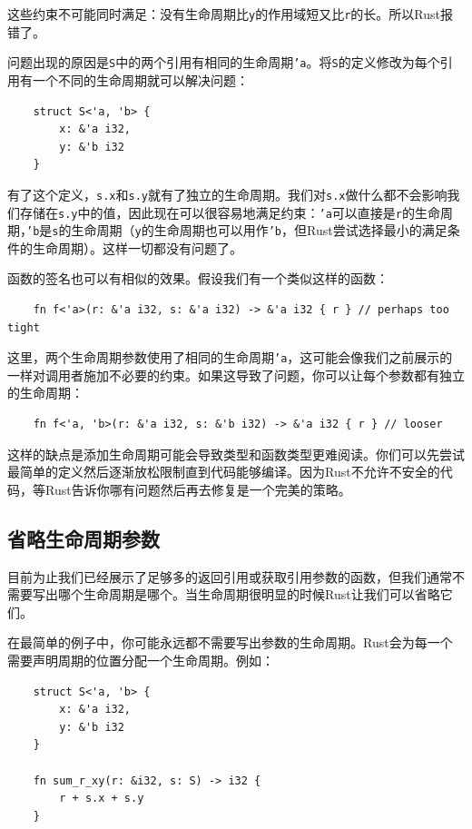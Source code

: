 这些约束不可能同时满足：没有生命周期比\texttt{y}的作用域短又比\texttt{r}的长。所以Rust报错了。

问题出现的原因是\texttt{S}中的两个引用有相同的生命周期\texttt{'a}。将\texttt{S}的定义修改为每个引用有一个不同的生命周期就可以解决问题：
\begin{verbatim}
    struct S<'a, 'b> {
        x: &'a i32,
        y: &'b i32
    }
\end{verbatim}

有了这个定义，\texttt{s.x}和\texttt{s.y}就有了独立的生命周期。我们对\texttt{s.x}做什么都不会影响我们存储在\texttt{s.y}中的值，因此现在可以很容易地满足约束：\texttt{'a}可以直接是\texttt{r}的生命周期，\texttt{'b}是\texttt{s}的生命周期（\texttt{y}的生命周期也可以用作\texttt{'b}，但Rust尝试选择最小的满足条件的生命周期）。这样一切都没有问题了。

函数的签名也可以有相似的效果。假设我们有一个类似这样的函数：
\begin{verbatim}
    fn f<'a>(r: &'a i32, s: &'a i32) -> &'a i32 { r } // perhaps too tight
\end{verbatim}

这里，两个生命周期参数使用了相同的生命周期\texttt{'a}，这可能会像我们之前展示的一样对调用者施加不必要的约束。如果这导致了问题，你可以让每个参数都有独立的生命周期：
\begin{verbatim}
    fn f<'a, 'b>(r: &'a i32, s: &'b i32) -> &'a i32 { r } // looser
\end{verbatim}

这样的缺点是添加生命周期可能会导致类型和函数类型更难阅读。你们可以先尝试最简单的定义然后逐渐放松限制直到代码能够编译。因为Rust不允许不安全的代码，等Rust告诉你哪有问题然后再去修复是一个完美的策略。

\subsection{省略生命周期参数}\label{OmitLifeTime}
目前为止我们已经展示了足够多的返回引用或获取引用参数的函数，但我们通常不需要写出哪个生命周期是哪个。当生命周期很明显的时候Rust让我们可以省略它们。

在最简单的例子中，你可能永远都不需要写出参数的生命周期。Rust会为每一个需要声明周期的位置分配一个生命周期。例如：
\begin{verbatim}
    struct S<'a, 'b> {
        x: &'a i32,
        y: &'b i32
    }

    fn sum_r_xy(r: &i32, s: S) -> i32 {
        r + s.x + s.y
    }
\end{verbatim}

